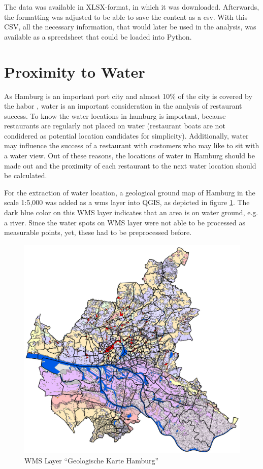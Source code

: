 \documentclass[a4paper, 11pt, oneside]{Thesis}  %
\begin{document}
The data was available in XLSX-format, in which it was downloaded. Afterwards, the formatting was adjusted to be able to save the content as a csv. With this CSV, all the necessary information, that would later be used in the analysis, was available as a spreedsheet that could be loaded into Python.

\section{Proximity to Water}

As Hamburg is an important port city and almost 10\% of the city is covered by the habor \cite{HamburgStadt2019}, water is an important consideration in the analysis of restaurant success. To know the water locations in hamburg is important, because restaurants are regularly not placed on water (restaurant boats are not condidered as potential location candidates for simplicity). Additionally, water may influence the success of a restaurant with customers who may like to sit with a water view. Out of these reasons, the locations of water in Hamburg should be made out and the proximity of each restaurant to the next water location should be calculated.

For the extraction of water location, a geological ground map of Hamburg in the scale 1:5,000 \cite{GeologischeKarte2019} was added as a \ac{wms} layer into QGIS, as depicted in figure \ref{fig:geologische_karte}. The dark blue color on this WMS layer indicates that an area is on water ground, e.g. a river. Since the water spots on WMS layer were not able to be processed as measurable points, yet, these had to be preprocessed before. 

\begin{figure}[h]
\includegraphics[scale=0.5]{Figures/WMS_Layer_Geologische_Karte.png}
\centering
\caption{WMS Layer ``Geologische Karte Hamburg''}
\label{fig:geologische_karte}
\end{figure}
\end{document}
